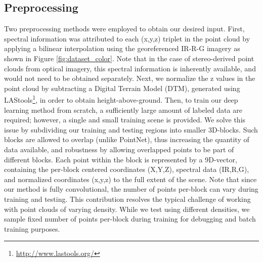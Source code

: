 \documentclass[final,3p,times,twocolumn,authoryear]{elsarticle}
\begin{document}
\subsection{Preprocessing}
\label{sec:preprocessing}
Two preprocessing methods were employed to obtain our desired input. 
First, spectral information was attributed to each (x,y,z) triplet in the point cloud by applying a bilinear interpolation using the georeferenced IR-R-G imagery as shown in Figure \ref{fig:dataset_color}. 
Note that in the case of stereo-derived point clouds from optical imagery, this spectral information is inherently available, and would not need to be obtained separately.  
Next, we normalize the z values in the point cloud by subtracting a Digital Terrain Model (DTM), generated using LAStools\footnote{\url{http://www.lastools.org/}}, in order to obtain height-above-ground. Then, to train our deep learning method from scratch, a sufficiently large amount of labeled data are required; however, a single and small training scene is provided. 
We solve this issue by subdividing our training and testing regions into smaller 3D-blocks. 
Such blocks are allowed to overlap (unlike PointNet), thus increasing the quantity of data available, and robustness by allowing overlapped points to be part of different blocks. 
Each point within the block is represented by a 9D-vector, containing the per-block centered coordinates (X,Y,Z), spectral data (IR,R,G), and normalized coordinates (x,y,z) to the full extent of the scene. 
Note that since our method is fully convolutional, the number of points per-block can vary during training and testing.
This contribution resolves the typical challenge of working with point clouds of varying density. 
While we test using different densities, we sample fixed number of points per-block during training for debugging and batch training purposes. 
\end{document}
